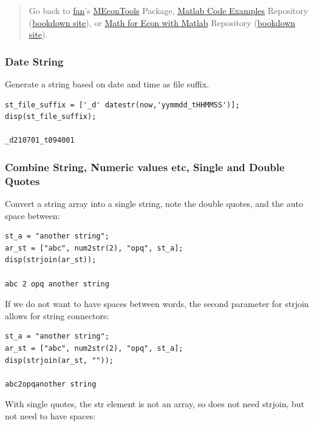 \documentclass[
]{book}
\begin{document}
\begin{quote}
Go back to \href{http://fanwangecon.github.io/}{fan}'s \href{https://fanwangecon.github.io/MEconTools/}{MEconTools} Package, \href{https://fanwangecon.github.io/M4Econ/}{Matlab Code Examples} Repository (\href{https://fanwangecon.github.io/M4Econ/bookdown}{bookdown site}), or \href{https://fanwangecon.github.io/Math4Econ/}{Math for Econ with Matlab} Repository (\href{https://fanwangecon.github.io/Math4Econ/bookdown}{bookdown site}).
\end{quote}

\hypertarget{date-string}{%
\subsubsection{Date String}\label{date-string}}

Generate a string based on date and time as file suffix.

\begin{verbatim}
st_file_suffix = ['_d' datestr(now,'yymmdd_tHHMMSS')];
disp(st_file_suffix);

_d210701_t094001
\end{verbatim}

\hypertarget{combine-string-numeric-values-etc-single-and-double-quotes}{%
\subsubsection{Combine String, Numeric values etc, Single and Double Quotes}\label{combine-string-numeric-values-etc-single-and-double-quotes}}

Convert a string array into a single string, note the double quotes, and
the auto space between:

\begin{verbatim}
st_a = "another string";
ar_st = ["abc", num2str(2), "opq", st_a];
disp(strjoin(ar_st));

abc 2 opq another string
\end{verbatim}

If we do not want to have spaces between words, the second parameter for
strjoin allows for string connectors:

\begin{verbatim}
st_a = "another string";
ar_st = ["abc", num2str(2), "opq", st_a];
disp(strjoin(ar_st, ""));

abc2opqanother string
\end{verbatim}

With single quotes, the str element is not an array, so does not need
strjoin, but not need to have spaces:
\end{document}
